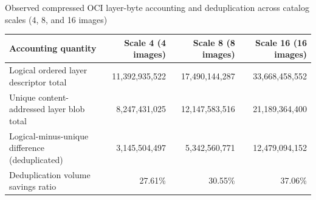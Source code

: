 \begin{table}[ht]{Observed compressed OCI layer-byte accounting and deduplication across catalog scales (4, 8, and 16 images)}
\label{tab:e5-storage}
\centering
\small
\begin{tabular}{lrrr}
\toprule
Accounting quantity & Scale 4 (4 images) & Scale 8 (8 images) & Scale 16 (16 images) \\
\midrule
Logical ordered layer descriptor total & 11,392,935,522 & 17,490,144,287 & 33,668,458,552 \\
Unique content-addressed layer blob total & 8,247,431,025 & 12,147,583,516 & 21,189,364,400 \\
Logical-minus-unique difference (deduplicated) & 3,145,504,497 & 5,342,560,771 & 12,479,094,152 \\
Deduplication volume savings ratio & 27.61\% & 30.55\% & 37.06\% \\
\bottomrule
\end{tabular}
\end{table}
